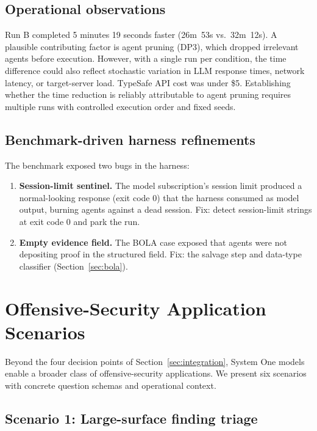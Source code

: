 \documentclass[conference]{IEEEtran}
\begin{document}
\subsection{Operational observations}

Run B completed 5 minutes 19 seconds faster (26m~53s vs.\ 32m~12s). A plausible contributing factor is agent pruning (DP3), which dropped irrelevant agents before execution. However, with a single run per condition, the time difference could also reflect stochastic variation in LLM response times, network latency, or target-server load. TypeSafe API cost was under \$5. Establishing whether the time reduction is reliably attributable to agent pruning requires multiple runs with controlled execution order and fixed seeds.

\subsection{Benchmark-driven harness refinements}

The benchmark exposed two bugs in the harness:
\begin{enumerate}[leftmargin=*]
\item \textbf{Session-limit sentinel.} The model subscription's session limit produced a normal-looking response (exit code 0) that the harness consumed as model output, burning agents against a dead session. Fix: detect session-limit strings at exit code 0 and park the run.
\item \textbf{Empty evidence field.} The BOLA case exposed that agents were not depositing proof in the structured field. Fix: the salvage step and data-type classifier (Section~\ref{sec:bola}).
\end{enumerate}

\section{Offensive-Security Application Scenarios}\label{sec:scenarios}

Beyond the four decision points of Section~\ref{sec:integration}, System One models enable a broader class of offensive-security applications. We present six scenarios with concrete question schemas and operational context.

\subsection{Scenario 1: Large-surface finding triage}
\end{document}
